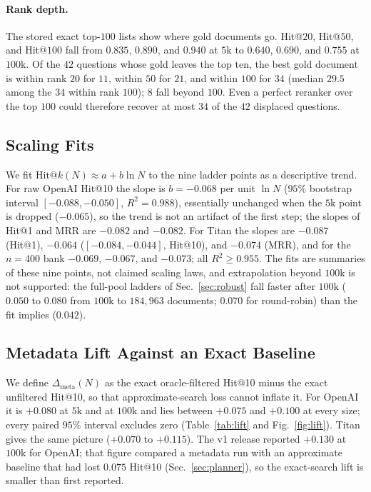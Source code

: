 \documentclass{ieeeaccess}
\makeatletter
\DeclareRobustCommand{\_}{\ifmmode\nfss@text{\textunderscore}\else\textunderscore\allowbreak\fi}
\makeatother
\begin{document}
\paragraph{Rank depth.}
The stored exact top-$100$ lists show where gold documents go. Hit@$20$, Hit@$50$, and Hit@$100$ fall from $0.835$, $0.890$, and $0.940$ at $5\text{k}$ to $0.640$, $0.690$, and $0.755$ at $100\text{k}$. Of the $42$ questions whose gold leaves the top ten, the best gold document is within rank $20$ for $11$, within $50$ for $21$, and within $100$ for $34$ (median $29.5$ among the $34$ within rank $100$); $8$ fall beyond $100$. Even a perfect reranker over the top $100$ could therefore recover at most $34$ of the $42$ displaced questions.

\subsection{Scaling Fits}
\label{sec:fits}
We fit $\mathrm{Hit@}k(N)\approx a+b\ln N$ to the nine ladder points as a descriptive trend. For raw OpenAI Hit@10 the slope is $b{=}{-}0.068$ per unit $\ln N$ ($95\%$ bootstrap interval $[-0.088,-0.050]$, $R^2{=}0.988$), essentially unchanged when the $5\text{k}$ point is dropped ($-0.065$), so the trend is not an artifact of the first step; the slopes of Hit@1 and MRR are $-0.082$ and $-0.082$. For Titan the slopes are $-0.087$ (Hit@1), $-0.064$ ($[-0.084,-0.044]$, Hit@10), and $-0.074$ (MRR), and for the $n{=}400$ bank $-0.069$, $-0.067$, and $-0.073$; all $R^2\ge0.955$. The fits are summaries of these nine points, not claimed scaling laws, and extrapolation beyond $100\text{k}$ is not supported: the full-pool ladders of Sec.~\ref{sec:robust} fall faster after $100\text{k}$ ($0.050$ to $0.080$ from $100\text{k}$ to $184{,}963$ documents; $0.070$ for round-robin) than the fit implies ($0.042$).

\subsection{Metadata Lift Against an Exact Baseline}
\label{sec:lift}
We define $\Delta_{\mathrm{meta}}(N)$ as the exact oracle-filtered Hit@10 minus the exact unfiltered Hit@10, so that approximate-search loss cannot inflate it. For OpenAI it is $+0.080$ at $5\text{k}$ and at $100\text{k}$ and lies between $+0.075$ and $+0.100$ at every size; every paired $95\%$ interval excludes zero (Table~\ref{tab:lift} and Fig.~\ref{fig:lift}). Titan gives the same picture ($+0.070$ to $+0.115$). The v1 release reported $+0.130$ at $100\text{k}$ for OpenAI; that figure compared a metadata run with an approximate baseline that had lost $0.075$ Hit@10 (Sec.~\ref{sec:planner}), so the exact-search lift is smaller than first reported.
\end{document}
